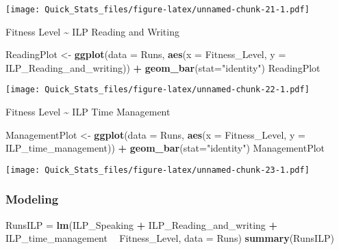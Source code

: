 \documentclass[]{article}
\newenvironment{Shaded}{\begin{snugshade}}{\end{snugshade}}
\newcommand{\KeywordTok}[1]{\textcolor[rgb]{0.13,0.29,0.53}{\textbf{#1}}}
\newcommand{\DataTypeTok}[1]{\textcolor[rgb]{0.13,0.29,0.53}{#1}}
\newcommand{\StringTok}[1]{\textcolor[rgb]{0.31,0.60,0.02}{#1}}
\newcommand{\OperatorTok}[1]{\textcolor[rgb]{0.81,0.36,0.00}{\textbf{#1}}}
\newcommand{\NormalTok}[1]{#1}
\begin{document}
\texttt{[image: Quick\_Stats\_files/figure-latex/unnamed-chunk-21-1.pdf]}

Fitness Level \textasciitilde{} ILP Reading and Writing

\begin{Shaded}
\begin{Highlighting}[]
\NormalTok{ReadingPlot <-}\StringTok{ }\KeywordTok{ggplot}\NormalTok{(}\DataTypeTok{data =}\NormalTok{ Runs, }\KeywordTok{aes}\NormalTok{(}\DataTypeTok{x =}\NormalTok{ Fitness_Level, }\DataTypeTok{y =}\NormalTok{ ILP_Reading_and_writing)) }\OperatorTok{+}
\StringTok{  }\KeywordTok{geom_bar}\NormalTok{(}\DataTypeTok{stat=}\StringTok{"identity"}\NormalTok{)}
\NormalTok{ReadingPlot}
\end{Highlighting}
\end{Shaded}

\texttt{[image: Quick\_Stats\_files/figure-latex/unnamed-chunk-22-1.pdf]}

Fitness Level \textasciitilde{} ILP Time Management

\begin{Shaded}
\begin{Highlighting}[]
\NormalTok{ManagementPlot <-}\StringTok{ }\KeywordTok{ggplot}\NormalTok{(}\DataTypeTok{data =}\NormalTok{ Runs, }\KeywordTok{aes}\NormalTok{(}\DataTypeTok{x =}\NormalTok{ Fitness_Level, }\DataTypeTok{y =}\NormalTok{ ILP_time_management)) }\OperatorTok{+}
\StringTok{  }\KeywordTok{geom_bar}\NormalTok{(}\DataTypeTok{stat=}\StringTok{"identity"}\NormalTok{)}
\NormalTok{ManagementPlot}
\end{Highlighting}
\end{Shaded}

\texttt{[image: Quick\_Stats\_files/figure-latex/unnamed-chunk-23-1.pdf]}

\subsubsection{Modeling}\label{modeling-4}

\begin{Shaded}
\begin{Highlighting}[]
\NormalTok{RunsILP =}\StringTok{ }\KeywordTok{lm}\NormalTok{(ILP_Speaking }\OperatorTok{+}\StringTok{ }\NormalTok{ILP_Reading_and_writing }\OperatorTok{+}\StringTok{ }\NormalTok{ILP_time_management }\OperatorTok{~}\StringTok{ }\NormalTok{Fitness_Level, }\DataTypeTok{data =}\NormalTok{ Runs)}
\KeywordTok{summary}\NormalTok{(RunsILP)}
\end{Highlighting}
\end{Shaded}
\end{document}
